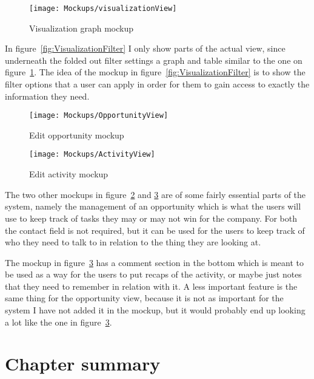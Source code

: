 \begin{figure}
  \centering
  \texttt{[image: Mockups/visualizationView]}
  \caption{Visualization graph mockup}
  \label{fig:VisualizationView}
\end{figure}

In figure~\ref{fig:VisualizationFilter} I only show parts  of the actual view, since underneath the folded out filter settings a graph and table similar to the one on figure~\ref{fig:VisualizationView}. The idea of the mockup in figure~\ref{fig:VisualizationFilter} is to show the filter options that a user can apply in order for them to gain access to exactly the information they need.

\begin{figure}
  \centering
  \texttt{[image: Mockups/OpportunityView]}
  \caption{Edit opportunity mockup}
  \label{fig:OpportunityView}
\end{figure}

\begin{figure}
  \centering
  \texttt{[image: Mockups/ActivityView]}
  \caption{Edit activity mockup}
  \label{fig:ActivityView}
\end{figure}

The two other mockups in figure~\ref{fig:OpportunityView} and \ref{fig:ActivityView} are of some fairly essential parts of the system, namely the management of an opportunity which is what the users will use to keep track of tasks they may or may not win for the company. For both the contact field is not required, but it can be used for the users to keep track of who they need to talk to in relation to the thing they are looking at.

The mockup in figure~\ref{fig:ActivityView} has a comment section in the bottom which is meant to be used as a way for the users to put recaps of the activity, or maybe just notes that they need to remember in relation with it. A less important feature is the same thing for the opportunity view, because it is not as important for the system I have not added it in the mockup, but it would probably end up looking a lot like the one in figure~\ref{fig:ActivityView}.

\section{Chapter summary}
